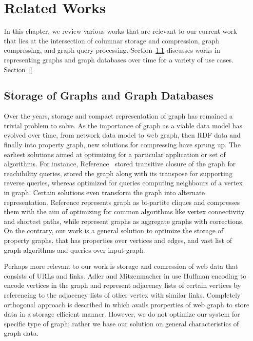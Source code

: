 \chapter{Related Works}
\label{c:related-works}

In this chapter, we review various works that are relevant to our current work that lies at the intersection of columnar storage and compression, graph compressing, and graph query processing. Section~\ref{graph-compression} discusses works in representing graphs and graph databases over time for a variety of use cases. Section~\ref{}

\section{Storage of Graphs and Graph Databases}
\label{graph-compression}

Over the years, storage and compact representation of graph has remained a trivial problem to solve. As the importance of graph as a viable data model has evolved over time, from network data model to web graph, then RDF data and finally into property graph, new solutions for compressing have sprung up. The earliest solutions aimed at optimizing for a particular application or set of algorithms. For instance, Reference~\cite{compress-transitive-closure} stored transitive closure of the graph for reachibility queries, \cite{Claude2010} stored the graph along with its transpose for supporting reverse queries, whereas \cite{compress-nbr-q} optimized for queries computing neighbours of a vertex in graph. Certain solutions even transform the graph into alternate representation. Reference \cite{feder} represents graph as bi-partite cliques and compresses them with the aim of optimizing for common algorithms like vertex connectivity and shortest paths, while \cite{graph-summ} represent graphs as aggregate graphs with corrections. On the contrary, our work is a general solution to optimize the storage of property graphs, that has properties over vertices and edges, and vast list of graph algorithms and queries over input graph.

Perhaps more relevant to our work is storage and comression of web data that consists of URLs and links. Adler and Mitzenmacher in \cite{adler} use Huffman encoding to encode vertices in the graph and represent adjacency lists of certain vertices by referencing to the adjacency lists of other vertex with similar links. Completely orthogonal approach is described in \cite{suel} which avails prorperties of web graph to store data in a storage efficient manner. However, we do not optimize our system for specific type of graph; rather we base our solution on general characteristics of graph data.

